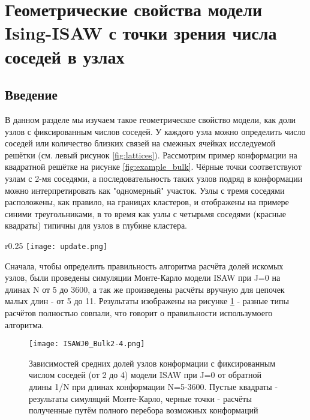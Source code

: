 \section{Геометрические свойства модели Ising-ISAW с точки зрения числа соседей в узлах}

\subsection{Введение}

В данном разделе мы изучаем такое геометрическое свойство модели, как доли узлов с фиксированным числов соседей. У каждого узла можно определить число соседей или количество близких связей на смежных ячейках исследуемой решётки (см. левый рисунок \ref{fig:lattices}). Рассмотрим пример конформации на квадратной решётке на рисунке \ref{fig:example_bulk}. Чёрные точки соответствуют узлам с 2-мя соседями, а последовательность таких узлов подряд в конформации можно интерпретировать как "одномерный" участок. Узлы с тремя соседями расположены, как правило, на границах кластеров, и отображены на примере синими треугольниками, в то время как узлы с четырьмя соседями (красные квадраты) типичны для узлов в глубине кластера.

\begin{wrapfigure}{r}{0.25\textwidth}
    \centering
    \texttt{[image: update.png]}
    \caption{Пример конформации на квадратной решётке с подсчётом соседей}
    \label{fig:example_bulk}
\end{wrapfigure}


Сначала, чтобы определить правильность алгоритма расчёта долей искомых узлов, были проведены симуляции Монте-Карло модели ISAW при J=0 на длинах N от 5 до 3600, а так же произведены расчёты вручную для цепочек малых длин - от 5 до 11. Результаты изображены на рисунке \ref{fig:ISAW_Bulk_J0} - разные типы расчётов полностью совпали, что говорит о правильности использумоего алгоритма.

\begin{figure}[]
    \centering
    \texttt{[image: ISAWJ0\_Bulk2-4.png]}
    \caption{Зависимостей средних долей узлов конформации с фиксированным числом соседей (от 2 до 4) модели ISAW при J=0 от обратной длины 1/N при длинах конформации N=5-3600. 
	Пустые квадраты - результаты симуляций Монте-Карло, черные точки - расчёты полученные путём полного перебора возможных конформаций\cite{web:sawRepos}}
    \label{fig:ISAW_Bulk_J0}
\end{figure}

